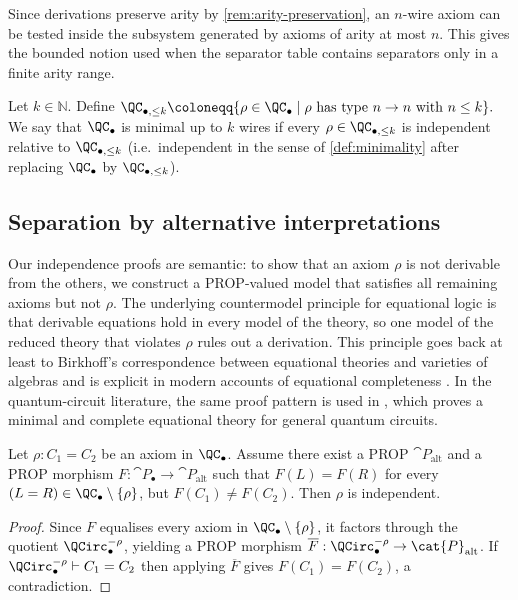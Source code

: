 Since derivations preserve arity by \cref{rem:arity-preservation}, an \(n\)-wire axiom can be tested
inside the subsystem generated by axioms of arity at most \(n\).  This gives the bounded notion used
when the separator table contains separators only in a finite arity range.

\begin{definition}\label{def:bounded-minimality}
Let \(k\in\mathbb{N}\).  Define
\(
  \QC_{\bullet,\le k}
   \coloneqq 
  \{ \rho\in\QC_\bullet \mid \rho \text{ has type } n\to n \text{ with } n\le k \}.
\)
We say that \(\QC_\bullet\) is minimal up to \(k\) wires if every \(\rho\in\QC_{\bullet,\le k}\) is independent
relative to \(\QC_{\bullet,\le k}\) (i.e.\ independent in the sense of \cref{def:minimality} after replacing
\(\QC_\bullet\) by \(\QC_{\bullet,\le k}\)).
\end{definition}

\subsection{Separation by alternative interpretations}

Our independence proofs are semantic: to show that an axiom \(\rho\) is not derivable from the others,
we construct a PROP-valued model that satisfies all remaining axioms but not \(\rho\).  The underlying
countermodel principle for equational logic is that derivable equations hold in every model of the
theory, so one model of the reduced theory that violates \(\rho\) rules out a derivation.  This
principle goes back at least to Birkhoff's correspondence between equational theories and varieties
of algebras \cite{Birkhoff1935} and is explicit in modern accounts of equational completeness
\cite[Thm.~14.19]{BurrisSankappanavar1981}.  In the quantum-circuit literature, the same proof
pattern is used in \cite{ClementDelormePerdrix2023}, which proves a minimal and complete
equational theory for general quantum circuits.

\begin{lemma}\label{lem:separation}
Let \(\rho:C_1=C_2\) be an axiom in \(\QC_\bullet\).  Assume there exist a PROP
\(\cat{P}_{\mathrm{alt}}\) and a PROP morphism \(F:\cat{P}_\bullet\to\cat{P}_{\mathrm{alt}}\) such that
\(F(L)=F(R)\) for every \((L=R)\in\QC_\bullet\setminus\{\rho\}\), but \(F(C_1)\neq F(C_2)\).  Then
\(\rho\) is independent.
\end{lemma}

\begin{proof}
Since \(F\) equalises every axiom in \(\QC_\bullet\setminus\{\rho\}\), it factors through the quotient
\(\QCirc_\bullet^{-\rho}\), yielding a PROP morphism
\(\overline{F}:\QCirc_\bullet^{-\rho}\to\cat{P}_{\mathrm{alt}}\).
If \(\QCirc_\bullet^{-\rho}\vdash C_1=C_2\) then applying \(\overline{F}\) gives \(F(C_1)=F(C_2)\), a contradiction.
\end{proof}

